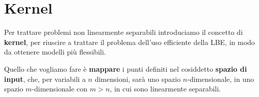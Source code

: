 \section{Kernel}
Per trattare problemi non linearmente separabili introduciamo il concetto di \textbf{kernel}, per riuscire a trattare il
problema dell'uso efficiente della LBE, in modo da ottenere modelli pi\`u flessibili.

Quello che vogliamo fare \`e \textbf{mappare} i punti definiti nel cosiddetto \textbf{spazio di input}, che, per variabili a
$n$ dimensioni, sar\`a uno spazio $n$-dimensionale, in uno spazio $m$-dimensionale con $m > n$, in cui sono linearmente
separabili.
